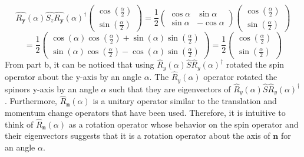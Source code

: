 \begin{sol}
\begin{enumerate}[label=\textbf{(\alph*)}]
\begin{equation}
\end{equation}
\begin{equation}
	\hat{R_\mathbf{y}}(\alpha)\hat{S_z}\hat{R_\mathbf{y}}(\alpha)^\dagger\begin{pmatrix}\cos(\frac{\alpha}{2})\\\sin(\frac{\alpha}{2})\end{pmatrix}=\frac{1}{2}\begin{pmatrix}\cos\alpha&\sin\alpha\\\sin\alpha&-\cos\alpha\end{pmatrix}\begin{pmatrix}\cos(\frac{\alpha}{2})\\\sin(\frac{\alpha}{2})\end{pmatrix}
\end{equation}
\begin{equation}
	=\frac{1}{2}\begin{pmatrix}\cos(\alpha)\cos(\frac{\alpha}{2})+\sin(\alpha)\sin(\frac{\alpha}{2})\\\sin(\alpha)\cos(\frac{\alpha}{2})-\cos(\alpha)\sin(\frac{\alpha}{2})\end{pmatrix}=\frac{1}{2}\begin{pmatrix}\cos(\frac{\alpha}{2})\\\sin(\frac{\alpha}{2})\end{pmatrix}
\end{equation}
From part b, it can be noticed that using $\hat R_y(\alpha)\hat S\hat R_y(\alpha)^\dagger$  rotated the spin operator about the y-axis by an angle $\alpha$. The $\hat R_y(\alpha)$ operator rotated the spinors y-axis by an angle $\alpha$ such that they are eigenvectors of $\hat R_y(\alpha)\hat S\hat R_y(\alpha)^\dagger$. Furthermore, $\hat R_\mathbf{n}(\alpha)$ is a unitary operator similar to the translation and momentum change operators that have been used. Therefore, it is intuitive to think of  $\hat R_\mathbf{n}(\alpha)$ as a rotation operator whose behavior on the spin operator and their eigenvectors suggests that it is a rotation operator about the axis of $\mathbf{n}$ for an angle $\alpha$.
\end{enumerate}
\end{sol}